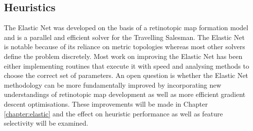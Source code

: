 \subsection{Heuristics}
The Elastic Net was developed on the basis of a retinotopic map formation model and is a parallel and efficient solver for the Travelling Salesman. The Elastic Net is notable because of its reliance on metric topologies whereas most other solvers define the problem discretely. Most work on improving the Elastic Net has been either implementing routines that execute it with speed and analysing methods to choose the correct set of parameters. An open question is whether the Elastic Net methodology can be more fundamentally improved by incorporating new understandings of retinotopic map development as well as more efficient gradient descent optimisations. These improvements will be made in Chapter \ref{chapter:elastic} and the effect on heuristic performance as well as feature selectivity will be examined. 
